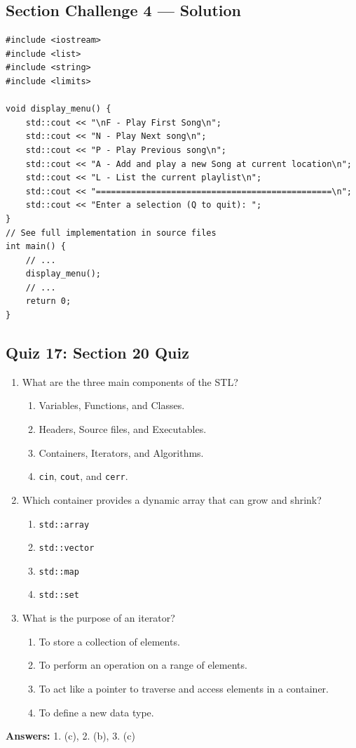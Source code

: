 \subsection{Section Challenge 4 --- Solution}
\begin{lstlisting}
#include <iostream>
#include <list>
#include <string>
#include <limits>

void display_menu() {
	std::cout << "\nF - Play First Song\n";
	std::cout << "N - Play Next song\n";
	std::cout << "P - Play Previous song\n";
	std::cout << "A - Add and play a new Song at current location\n";
	std::cout << "L - List the current playlist\n";
	std::cout << "===============================================\n";
	std::cout << "Enter a selection (Q to quit): ";
}
// See full implementation in source files
int main() {
	// ...
	display_menu();
	// ...
	return 0;
}
\end{lstlisting}

\subsection{Quiz 17: Section 20 Quiz}
\begin{enumerate}
    \item What are the three main components of the STL?
    \begin{enumerate}
        \item[a)] Variables, Functions, and Classes.
        \item[b)] Headers, Source files, and Executables.
        \item[c)] Containers, Iterators, and Algorithms.
        \item[d)] \texttt{cin}, \texttt{cout}, and \texttt{cerr}.
    \end{enumerate}

    \item Which container provides a dynamic array that can grow and shrink?
    \begin{enumerate}
        \item[a)] \texttt{std::array}
        \item[b)] \texttt{std::vector}
        \item[c)] \texttt{std::map}
        \item[d)] \texttt{std::set}
    \end{enumerate}

    \item What is the purpose of an iterator?
    \begin{enumerate}
        \item[a)] To store a collection of elements.
        \item[b)] To perform an operation on a range of elements.
        \item[c)] To act like a pointer to traverse and access elements in a container.
        \item[d)] To define a new data type.
    \end{enumerate}
\end{enumerate}

\textbf{Answers:} 1. (c), 2. (b), 3. (c)
